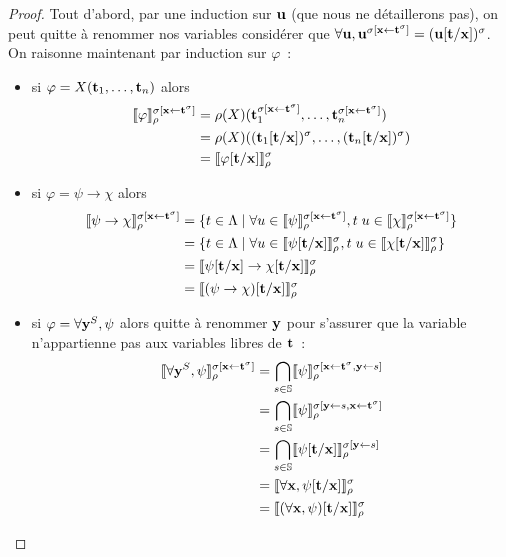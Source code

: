 \documentclass{article}
\begin{document}
\begin{proof}
  Tout d'abord, par une induction sur $\mathbf{u}$ (que nous ne détaillerons pas), on peut quitte à renommer nos variables considérer que $\forall \mathbf{u}, \mathbf{u}^{\sigma[\mathbf{x}\leftarrow \mathbf{t}^\sigma]} = (\mathbf{u}[\mathbf{t}/\mathbf{x}])^\sigma$. On raisonne maintenant par induction sur $\varphi$~:
  \begin{itemize}
  \item si $\varphi = X(\mathbf{t}_1,\ldots,\mathbf{t}_n)$ alors
    \begin{align*}
      \llbracket \varphi \rrbracket_\rho^{\sigma[\mathbf{x}\leftarrow \mathbf{t}^\sigma]} &= \rho(X)(\mathbf{t}_1^{\sigma[\mathbf{x}\leftarrow \mathbf{t}^\sigma]},\ldots,\mathbf{t}_n^{\sigma[\mathbf{x}\leftarrow \mathbf{t}^\sigma]})\\
      &= \rho(X)((\mathbf{t}_1[\mathbf{t}/\mathbf{x}])^\sigma,\ldots,(\mathbf{t}_n[\mathbf{t}/\mathbf{x}])^\sigma)\\
      &= \llbracket \varphi[\mathbf{t}/\mathbf{x}] \rrbracket_\rho^\sigma
    \end{align*}
  \item si $\varphi = \psi \to \chi$ alors
    \begin{align*}
      \llbracket \psi\to\chi \rrbracket_\rho^{\sigma[\mathbf{x}\leftarrow\mathbf{t}^\sigma]} &= \{t\in\Lambda\mid \forall u\in\llbracket \psi \rrbracket_\rho^{\sigma[\mathbf{x}\leftarrow\mathbf{t}^\sigma]}, t\;u \in \llbracket \chi \rrbracket_\rho^{\sigma[\mathbf{x}\leftarrow\mathbf{t}^\sigma]}\}\\
      &= \{t\in\Lambda\mid\forall u\in \llbracket \psi[\mathbf{t}/\mathbf{x}] \rrbracket_\rho^\sigma, t\;u\in\llbracket \chi[\mathbf{t}/\mathbf{x}] \rrbracket_\rho^\sigma\}\\
      &= \llbracket \psi[\mathbf{t}/\mathbf{x}]\to\chi[\mathbf{t}/\mathbf{x}] \rrbracket_\rho^\sigma\\
      &= \llbracket (\psi\to\chi)[\mathbf{t}/\mathbf{x}] \rrbracket_\rho^\sigma
    \end{align*}
  \item si $\varphi = \forall \mathbf{y}^S, \psi$ alors quitte à renommer $\mathbf{y}$ pour s'assurer que la variable n'appartienne pas aux variables libres de $\mathbf{t}$~:
    \begin{align*}
      \llbracket \forall \mathbf{y}^S,\psi \rrbracket_\rho^{\sigma[\mathbf{x}\leftarrow\mathbf{t}^\sigma]} &= \bigcap_{s\in \mathbb{S}}\llbracket \psi \rrbracket_\rho^{\sigma[\mathbf{x}\leftarrow\mathbf{t}^\sigma,\mathbf{y}\leftarrow s]}\\
      &= \bigcap_{s\in\mathbb{S}}\llbracket \psi \rrbracket_\rho^{\sigma[\mathbf{y}\leftarrow s, \mathbf{x}\leftarrow \mathbf{t}^\sigma]}\\
      &= \bigcap_{s\in\mathbb{S}}\llbracket \psi[\mathbf{t}/\mathbf{x}] \rrbracket_\rho^{\sigma[\mathbf{y}\leftarrow s]}\\
      &= \llbracket \forall \mathbf{x}, \psi[\mathbf{t}/\mathbf{x}] \rrbracket_\rho^\sigma\\
      &= \llbracket (\forall \mathbf{x}, \psi)[\mathbf{t}/\mathbf{x}] \rrbracket_\rho^\sigma
    \end{align*}

\end{itemize}
\end{proof}
\end{document}
